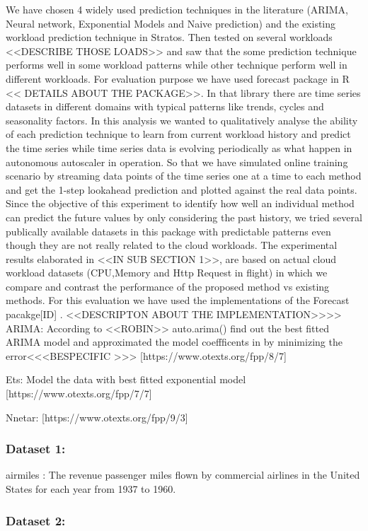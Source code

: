 We have chosen 4 widely used prediction techniques in the literature (ARIMA, Neural network, Exponential Models and Naive prediction) and the existing workload prediction technique in Stratos. Then tested on several workloads <<DESCRIBE THOSE LOADS>> and saw that the some prediction technique performs well in some workload patterns while other technique perform well in different workloads.
For evaluation purpose we have used forecast package in R << DETAILS ABOUT THE PACKAGE>>. In that library there are time series datasets in different domains with typical patterns like trends, cycles and seasonality factors. In this analysis we wanted to qualitatively analyse the ability of each prediction technique to learn from current workload history and predict the time series while time series data is evolving periodically as what happen in autonomous autoscaler in operation. So that we have simulated online training scenario by streaming data points of the time series one at a time to each method and get the 1-step lookahead prediction and plotted against the real data points. Since the objective of this experiment to identify  how well an individual method can predict the future values by only considering the past history, we tried several publically available datasets in this package with predictable patterns even though they are not really related to the cloud workloads. The experimental results elaborated in <<IN SUB SECTION 1>>, are based on actual cloud workload datasets (CPU,Memory and Http Request in flight)  in which we  compare and contrast the performance of the proposed method vs existing methods. 
For this evaluation we have used the implementations of the Forecast pacakge[ID] . <<DESCRIPTON ABOUT THE IMPLEMENTATION>>>>
ARIMA: According to <<ROBIN>> auto.arima()  find out the best fitted ARIMA model and approximated the model coeffficents in by minimizing the error<<<BESPECIFIC >>> [https://www.otexts.org/fpp/8/7]

Ets: Model the data with best fitted exponential model [https://www.otexts.org/fpp/7/7]

	Nnetar: [https://www.otexts.org/fpp/9/3]

\subsubsection{Dataset 1:}

airmiles : The revenue passenger miles flown by commercial airlines in the United States for each year from 1937 to 1960.


\subsubsection{Dataset 2:}


